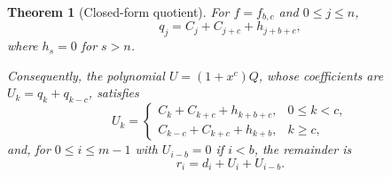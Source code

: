 \documentclass{ieeeaccess}
\theoremstyle{plain}
\newtheorem{theorem}{Theorem}
\theoremstyle{definition}
\begin{document}
\begin{theorem}[Closed-form quotient]
\label{thm:quotient}
For $f=f_{b,c}$ and $0\le j\le n$,
\begin{equation}\label{eq:qclosed}
  q_j=C_j+C_{j+c}+h_{j+b+c},
\end{equation}
where $h_s=0$ for $s>n$.

Consequently, the polynomial $U=(1+x^c)Q$, whose coefficients are
$U_k=q_k+q_{k-c}$, satisfies
\begin{equation}\label{eq:Uclosed}
  U_k=
  \begin{cases}
    C_k+C_{k+c}+h_{k+b+c},
      & 0\le k<c,\\[2pt]
    C_{k-c}+C_{k+c}+h_{k+b},
      & k\ge c,
  \end{cases}
\end{equation}
and, for $0\le i\le m-1$ with $U_{i-b}=0$ if $i<b$, the remainder is
\begin{equation}\label{eq:rU}
  r_i=d_i+U_i+U_{i-b}.
\end{equation}
\end{theorem}
\end{document}
